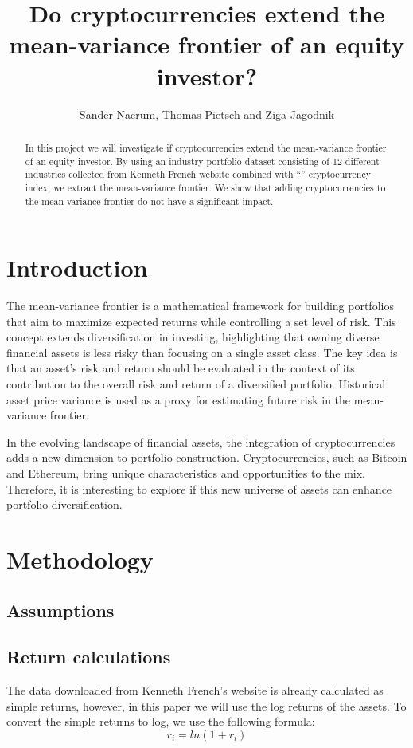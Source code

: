 \documentclass[12pt,a4paper]{article}
\title{Do cryptocurrencies extend the mean-variance frontier of an equity investor?}
\author{Sander Naerum, Thomas Pietsch and Ziga Jagodnik}
\begin{document}
\maketitle

\begin{abstract}
In this project we will investigate if cryptocurrencies extend the mean-variance frontier of an equity investor. 
By using an industry portfolio dataset consisting of 12 different industries collected from Kenneth French website 
combined with “” cryptocurrency index, we extract the mean-variance frontier. We show that adding cryptocurrencies to 
the mean-variance frontier do not have a significant impact.  
\end{abstract}

\section{Introduction}\label{sec:intro}
The mean-variance frontier is a mathematical framework for building portfolios that aim to maximize expected returns 
while controlling a set level of risk. This concept extends diversification in investing, highlighting that owning 
diverse financial assets is less risky than focusing on a single asset class. The key idea is that an asset's risk and 
return should be evaluated in the context of its contribution to the overall risk and return of a diversified portfolio. 
Historical asset price variance is used as a proxy for estimating future risk in the mean-variance frontier.

In the evolving landscape of financial assets, the integration of cryptocurrencies adds a new dimension to portfolio 
construction. Cryptocurrencies, such as Bitcoin and Ethereum, bring unique characteristics and opportunities to the mix. 
Therefore, it is interesting to explore if this new universe of assets can enhance portfolio diversification. 

\section{Methodology}\label{sec:methods}
\subsection{Assumptions}
\subsection{Return calculations}
The data downloaded from Kenneth French's website is already calculated as simple returns, however, in this paper we will use the log returns of the assets. To convert the simple returns to log, we use the following formula: 
$$r_i = ln(1+r_i)$$
\end{document}
